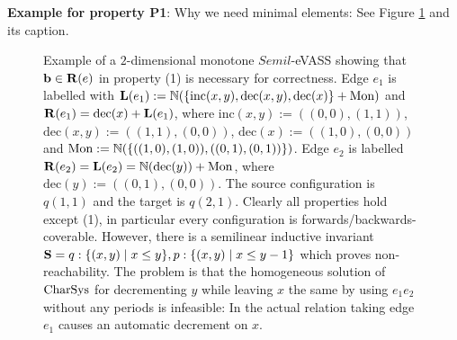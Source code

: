 \textbf{Example for property P1}: Why we need minimal elements: See Figure \ref{FigureExamplePropertyOne} and its caption.

\begin{figure}[h!]
\begin{centering}
\end{centering}

\caption{Example of a \(2\)-dimensional monotone \(Semil\)-eVASS showing that \(\mathbf{b} \in \mathbf{R}(e)\) in property (1) is necessary for correctness. Edge \(e_1\) is labelled with \(\mathbf{L}(e_1):=\mathbb{N}(\{\text{inc}(x,y), \text{dec}(x,y), \text{dec}(x)\}+\text{Mon})\) and \(\mathbf{R}(e_1)=\text{dec}(x)+\mathbf{L}(e_1)\), where \(\text{inc}(x,y):=((0,0),(1,1))\), \(\text{dec}(x,y):=((1,1), (0,0))\), \(\text{dec}(x):=((1,0),(0,0))\) and \(\text{Mon}:=\mathbb{N}(\{((1,0),(1,0)), ((0,1),(0,1))\})\). Edge \(e_2\) is labelled \(\mathbf{R}(e_2)=\mathbf{L}(e_2)=\mathbb{N}(\text{dec}(y))+\text{Mon}\), where \(\text{dec}(y):=((0,1), (0,0))\). The source configuration is \(q(1,1)\) and the target is \(q(2,1)\). Clearly all properties hold except (1), in particular every configuration is forwards/backwards-coverable. 
\newline However, there is a semilinear inductive invariant \(\mathbf{S}=q:\{(x,y) \mid x \leq y\}, p: \{(x,y) \mid x \leq y-1\}\) which proves non-reachability. The problem is that the homogeneous solution of \(\operatorname{CharSys}\) for decrementing \(y\) while leaving \(x\) the same by using \(e_1 e_2\) without any periods is infeasible: In the actual relation taking edge \(e_1\) causes an automatic decrement on \(x\).}\label{FigureExamplePropertyOne}
\end{figure}

